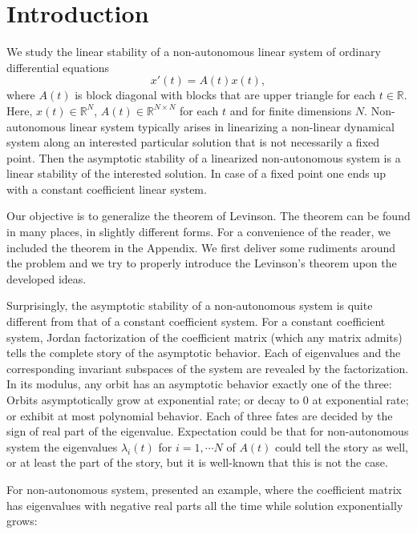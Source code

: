 \documentclass[a4paper,11pt]{article}
\theoremstyle{remark}
\begin{document}
\section{Introduction}

We study the linear stability of a non-autonomous linear system of ordinary differential equations
\begin{equation}
 x'(t) = A(t)x(t), \label{eq:0}
\end{equation}
where $A(t)$ is block diagonal with blocks that are upper triangle  for each $t \in \mathbb{R}$.  Here, $x(t) \in \mathbb{R}^N$, $A(t)\in \mathbb{R}^{N\times N}$ for each $t$ and for finite dimensions $N$.
Non-autonomous linear system typically arises in linearizing a non-linear dynamical system along an interested particular solution that is not necessarily a fixed point. Then the asymptotic stability of a linearized non-autonomous system is a linear stability of the interested solution. In case of a fixed point one ends up with a constant coefficient linear system.

Our objective is to generalize the theorem of Levinson. The theorem can be found in many places, in slightly different forms. For a convenience of the reader, we included the theorem in the Appendix. %
We first deliver some rudiments around the problem and we try to properly introduce the Levinson's theorem upon the developed ideas. 





Surprisingly, the asymptotic stability of a non-autonomous system is quite different from that of a constant coefficient system. For a constant coefficient system, Jordan factorization of the coefficient matrix (which any matrix admits) tells the complete story of the asymptotic behavior. Each of eigenvalues and the corresponding invariant subspaces of the system are revealed by the factorization. In its modulus, any orbit has an asymptotic behavior exactly one of the three: Orbits asymptotically grow at exponential rate; or decay to $0$ at exponential rate; or exhibit at most polynomial behavior. Each of three fates are decided by the sign of real part of the eigenvalue. 
Expectation could be that for non-autonomous system the eigenvalues $\lambda_i(t)$ for $i=1,\cdots N$ of $A(t)$ could tell the story as well, or at least the part of the story, but it is well-known that this is not the case. 

For non-autonomous system, \cite{MY60} presented an example, where the coefficient matrix has eigenvalues with negative real parts all the time while solution exponentially grows:
\end{document}
